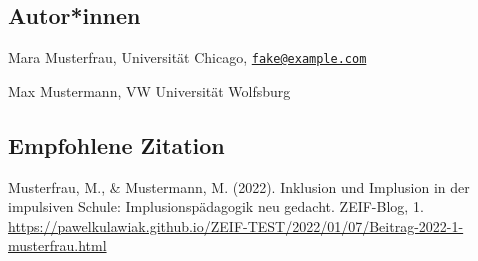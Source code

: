 \documentclass[
]{article}
\begin{document}
\hypertarget{autorinnen}{%
\subsection{Autor*innen}\label{autorinnen}}

Mara Musterfrau, Universität Chicago,
\href{mailto:fake@example.com}{\nolinkurl{fake@example.com}}

Max Mustermann, VW Universität Wolfsburg

\hypertarget{empfohlene-zitation}{%
\subsection{Empfohlene Zitation}\label{empfohlene-zitation}}

Musterfrau, M., \& Mustermann, M. (2022). Inklusion und Implusion in der
impulsiven Schule: Implusionspädagogik neu gedacht. ZEIF-Blog, 1.
\url{https://pawelkulawiak.github.io/ZEIF-TEST/2022/01/07/Beitrag-2022-1-musterfrau.html}
\end{document}

